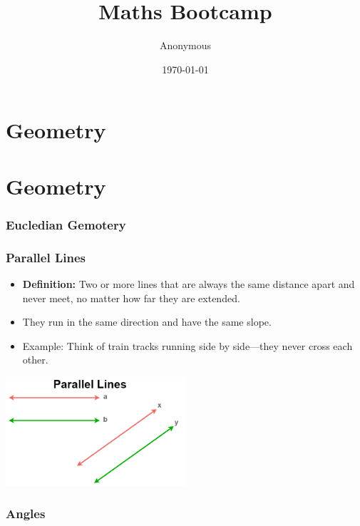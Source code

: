 \documentclass{beamer}
\title{Maths Bootcamp}
\author{Anonymous}
\institute{Overleaf}
\date{\today}
\begin{document}
\frame{\titlepage}

\section{Geometry} 
\section{ Geometry}

\begin{frame}
    \frametitle{Eucledian Gemotery}
\end{frame}

\begin{frame}
    \frametitle{Parallel Lines}
    
    \begin{itemize}
        \item \textbf{Definition:} Two or more lines that are always the same distance apart and never meet, no matter how far they are extended.
        \item They run in the same direction and have the same slope.
        \item Example: Think of train tracks running side by side—they never cross each other.
    \end{itemize}
    
    \begin{center}
        \includegraphics[width=0.5\textwidth]{Parallellines.png} %
    \end{center}

\end{frame}
\begin{frame}
    \frametitle{Angles}
\end{frame}
\end{document}

